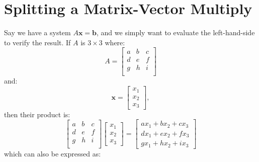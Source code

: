 \documentclass[11pt, letterpaper]{article}
\numberwithin{equation}{section}
\begin{document}
	\section{Splitting a Matrix-Vector Multiply} \label{sec:matrix-vector-multiply}
	Say we have a system $A\mathbf{x}=\mathbf{b}$, and we simply want to evaluate the left-hand-side to verify the result.
	If $A$ is $3\times 3$ where:
	\begin{equation}
		\label{eq:a-matrix}
		A = \begin{bmatrix}
				a & b & c \\
				d & e & f \\
				g & h & i \\
		\end{bmatrix}
	\end{equation}
	and:
	\begin{equation}
		\label{eq:x_vec}
		\mathbf{x} =
		\begin{bmatrix}
			x_1 \\
			x_2 \\
			x_3
		\end{bmatrix},
	\end{equation}
	then their product is:
	\begin{equation}
		\label{eq:ax-product}
		\begin{bmatrix}
			a & b & c \\
			d & e & f \\
			g & h & i \\
		\end{bmatrix}
		\begin{bmatrix}
			x_1 \\
			x_2 \\
			x_3
		\end{bmatrix}=
		\begin{bmatrix}
			ax_1+bx_2+cx_3 \\
			dx_1+ex_2+fx_3 \\
			gx_1+hx_2+ix_3
		\end{bmatrix}
	\end{equation}
	which can also be expressed as:
\end{document}
